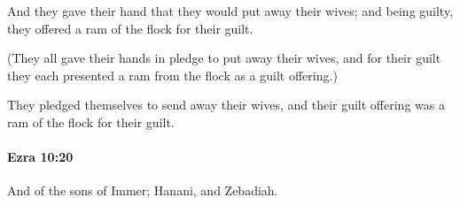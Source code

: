 			\begin{versebox}
					\item[BHS] 
					\item[LXX] 
					\item[ASV] And they gave their hand that they would put away their wives; and being guilty, they offered a ram of the flock for their guilt.
					\item[NIV] (They all gave their hands in pledge to put away their wives, and for their guilt they each presented a ram from the flock as a guilt offering.)
					\item[NRSV] They pledged themselves to send away their wives, and their guilt offering was a ram of the flock for their guilt.
			\end{versebox}

		\paragraph{Ezra 10:20} %
			\label{EZRA-10-20}

			And of the sons of Immer; Hanani, and Zebadiah.

